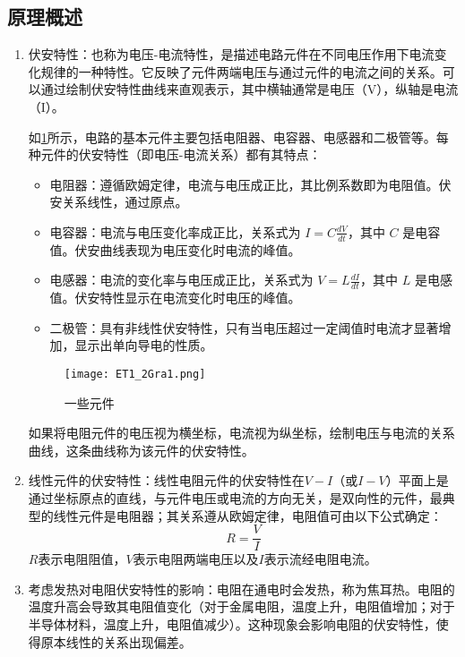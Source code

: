 \documentclass[dvipsnames, svgnames,a4paper,11pt]{article}
\begin{document}
	\subsection{原理概述}
	\begin{enumerate}
		\item 伏安特性：也称为电压-电流特性，是描述电路元件在不同电压作用下电流变化规律的一种特性。它反映了元件两端电压与通过元件的电流之间的关系。可以通过绘制伏安特性曲线来直观表示，其中横轴通常是电压（V），纵轴是电流（I）。
		
		如\cref{fig:fig1}所示，电路的基本元件主要包括电阻器、电容器、电感器和二极管等。每种元件的伏安特性（即电压-电流关系）都有其特点：
		
		\begin{itemize}
			\item 电阻器：遵循欧姆定律，电流与电压成正比，其比例系数即为电阻值。伏安关系线性，通过原点。
			\item 电容器：电流与电压变化率成正比，关系式为 \(I = C \frac{dV}{dt}\)，其中 \(C\) 是电容值。伏安曲线表现为电压变化时电流的峰值。
			\item 电感器：电流的变化率与电压成正比，关系式为 \(V = L \frac{dI}{dt}\)，其中 \(L\) 是电感值。伏安特性显示在电流变化时电压的峰值。
			\item 二极管：具有非线性伏安特性，只有当电压超过一定阈值时电流才显著增加，显示出单向导电的性质。
		\end{itemize}
		
		
		\begin{figure}[htbp]
			\centering
			\texttt{[image: ET1\_2Gra1.png]}
			\caption{一些元件}
			\label{fig:fig1}
		\end{figure}
		
		如果将电阻元件的电压视为横坐标，电流视为纵坐标，绘制电压与电流的关系曲线，这条曲线称为该元件的伏安特性。
		
		\item 线性元件的伏安特性：线性电阻元件的伏安特性在\(V-I\)（或\(I-V\)）平面上是通过坐标原点的直线，与元件电压或电流的方向无关，是双向性的元件，最典型的线性元件是电阻器；其关系遵从欧姆定律，电阻值可由以下公式确定：\[R = \frac{V}{I}\]
		$R$表示电阻阻值，$V$表示电阻两端电压以及$I$表示流经电阻电流。
		
		\item 考虑发热对电阻伏安特性的影响：电阻在通电时会发热，称为焦耳热。电阻的温度升高会导致其电阻值变化（对于金属电阻，温度上升，电阻值增加；对于半导体材料，温度上升，电阻值减少）。这种现象会影响电阻的伏安特性，使得原本线性的关系出现偏差。
		

\end{enumerate}
\end{document}

